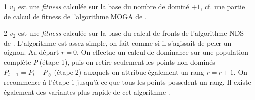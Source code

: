 \begin{table}[!p]
\begin{sidecaption}[fortoc]
{\begin{threeparttable}
\begin{tabular}{>{$}l<{$} >{$}l<{$} >{$}l<{$} >{$}l<{$} >{$}l<{$} >{$}l<{$}}
			\bottomrule
	\end{tabular}
	\begin{tablenotes}
      \small
      \item[1] $v_1$ est une \textit{fitness} calculée sur la base du nombre de dominé $+ 1$, cf. une partie de calcul de fitness de l'algorithme MOGA de \textcite{Fonseca1993}. 
      \item[2] $v_2$ est une \textit{fitness} calculée sur la base du calcul de fronts de l'algorithme NDS de \textcite{Goldberg1989}. L'algorithme est assez simple, on fait comme si il s'agissait de peler un oignon. Au départ $r = 0$. On effectue un calcul de dominance sur une population complète $P$ (étape 1), puis on retire seulement les points non-dominés $P_{t+1} = P_{t} - P_{\varnothing}$ (étape 2) auxquels on attribue également un rang $r = r + 1$.  On recommence à l'étape 1 jusqu'à ce que tous les points possèdent un rang. Il existe également des variantes plus rapide de cet algorithme \autocite{Deb2001}.
    \end{tablenotes}
	
	
	\label{pranking:b}
	\end{threeparttable}}
  \end{sidecaption}
\end{table}

\pagebreak

